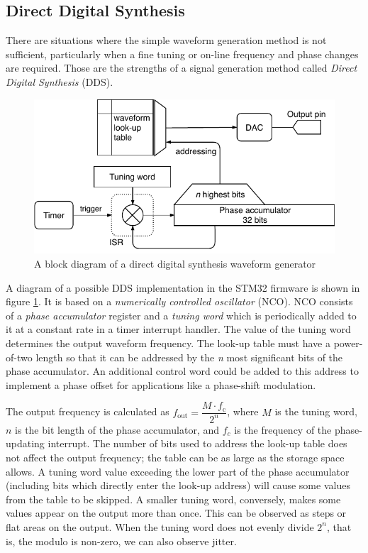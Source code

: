 \subsection{Direct Digital Synthesis} \label{sec:theory-dac-dds}

There are situations where the simple waveform generation method is not sufficient, particularly when a fine tuning or on-line frequency and phase changes are required. Those are the strengths of a signal generation method called \textit{Direct Digital Synthesis} (DDS).

\begin{figure}[h]
	\centering
	\includegraphics[scale=1] {img/wavegen-dds.pdf}
	\caption{\label{fig:wavegen-dds}A block diagram of a direct digital synthesis waveform generator}
\end{figure}

A diagram of a possible DDS implementation in the STM32 firmware is shown in figure \ref{fig:wavegen-dds}. It is based on a \textit{numerically controlled oscillator} (NCO). NCO consists of a \textit{phase accumulator} register and a \textit{tuning word} which is periodically added to it at a constant rate in a timer interrupt handler. The value of the tuning word determines the output waveform frequency. The look-up table must have a power-of-two length so that it can be addressed by the \textit{n} most significant bits of the phase accumulator. An additional control word could be added to this address to implement a phase offset for applications like a phase-shift modulation.

The output frequency is calculated as \(f_\mathrm{out} = \dfrac{M\cdot f_\mathrm{c}}{2^n}\), where $M$ is the tuning word, $n$ is the bit length of the phase accumulator, and $f_c$ is the frequency of the phase-updating interrupt. The number of bits used to address the look-up table does not affect the output frequency; the table can be as large as the storage space allows. A tuning word value exceeding the lower part of the phase accumulator (including bits which directly enter the look-up address) will cause some values from the table to be skipped. A smaller tuning word, conversely, makes some values appear on the output more than once. This can be observed as steps or flat areas on the output. When the tuning word does not evenly divide $2^n$, that is, the modulo is non-zero, we can also observe jitter.

